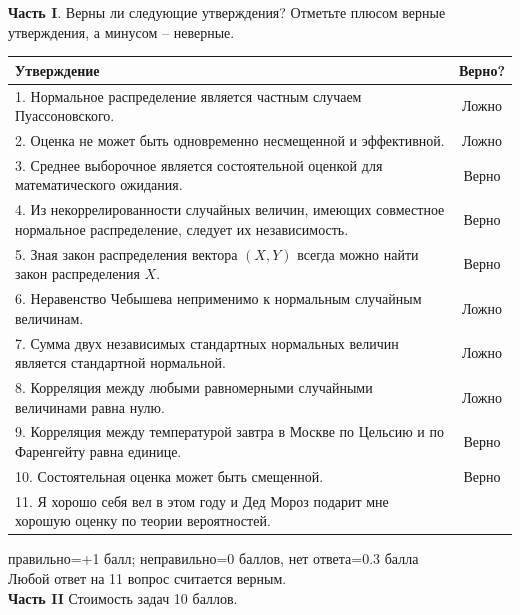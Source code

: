 \documentclass[12pt, a4paper]{article}\usepackage[]{graphicx}\usepackage[]{color}
\begin{document}
		\textbf{Часть I}. Верны ли следующие утверждения? Отметьте плюсом верные утверждения, а минусом -- неверные. \\

		\renewcommand\arraystretch{2.0}

		\begin{tabular}{|p{15cm}|c|}
			\hline
			Утверждение & Верно? \\
			\hline
			1. Нормальное распределение является частным случаем Пуассоновского.  &  Ложно \\
			\hline
			2. Оценка не может быть одновременно несмещенной и эффективной. &  Ложно \\
			\hline
			3. Среднее выборочное является состоятельной оценкой для математического ожидания. &  Верно \\
			\hline
			4. Из некоррелированности случайных величин, имеющих совместное нормальное распределение,  следует их независимость. &  Верно \\
			\hline
			5. Зная закон распределения вектора $(X,Y)$ всегда можно найти закон распределения $X$. &  Верно \\
			\hline
			6. Неравенство Чебышева неприменимо к нормальным случайным величинам. & Ложно \\
			\hline
			7. Сумма двух независимых стандартных нормальных величин является стандартной нормальной. & Ложно \\
			\hline
			8. Корреляция между любыми равномерными случайными величинами равна нулю. &  Ложно \\
			\hline
			9. Корреляция между температурой завтра в Москве по Цельсию и по Фаренгейту равна единице. &  Верно \\
			\hline
			10. Состоятельная оценка может быть смещенной. &  Верно \\
			\hline
			11. Я хорошо себя вел в этом году и Дед Мороз подарит мне хорошую оценку по теории вероятностей. &  \\
			\hline
		\end{tabular}

		правильно=+1 балл; неправильно=0 баллов, нет ответа=0.3 балла \\
		Любой ответ на 11 вопрос считается верным. \\

		\textbf{Часть II} Стоимость задач 10 баллов. \\
\end{document}
